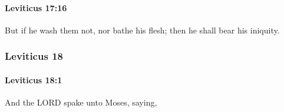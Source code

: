 		\paragraph{Leviticus 17:16} %
			\label{LEVITICUS-17-16}

			But if he wash them not, nor bathe his flesh; then he shall bear his iniquity.

	\subsubsection{Leviticus 18} %
		\label{LEVITICUS-18}

		\paragraph{Leviticus 18:1} %
			\label{LEVITICUS-18-1}

			And the LORD spake unto Moses, saying,

